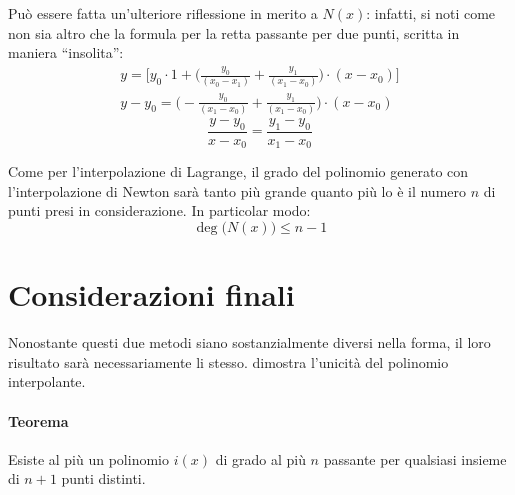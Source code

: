 Può essere fatta un'ulteriore riflessione in merito a $N(x)$: infatti, si noti come non sia altro che la formula per la retta passante per due punti, scritta in maniera ``insolita'':
\begin{gather*}
y=\Bigg[y_0\cdot1+\Bigg(\frac{y_0}{(x_0-x_1)}+\frac{y_1}{(x_1-x_0)}\Bigg)\cdot(x-x_0)\Bigg]\\
y-y_0=\Bigg(-\frac{y_0}{(x_1-x_0)}+\frac{y_1}{(x_1-x_0)}\Bigg)\cdot(x-x_0)\end{gather*}
\begin{equation}
\frac{y-y_0}{x-x_0}=\frac{y_1-y_0}{x_1-x_0}\label{retta:2}
\end{equation}

Come per l'interpolazione di Lagrange, il grado del polinomio generato con l'interpolazione di Newton sarà tanto più grande quanto più lo è il numero $n$ di punti presi in considerazione. In particolar modo:
\[
\deg \big(N(x)\big)\le n-1
\] 

\section{Considerazioni finali}

Nonostante questi due metodi siano sostanzialmente diversi nella forma, il loro risultato sarà necessariamente li stesso. \parencite[Esistenza e unicità del polinomio interpolante]{int:unimi} dimostra l'unicità del polinomio interpolante.

\paragraph{Teorema} Esiste al più un polinomio $i(x)$ di grado al più $n$ passante per qualsiasi insieme di $n+1$ punti distinti.

